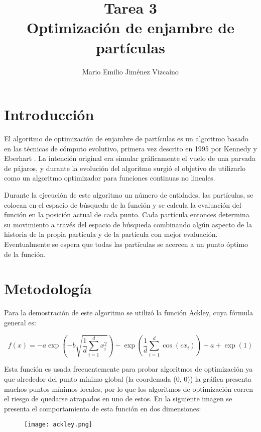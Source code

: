 \documentclass[sigconf,authorversion,nonacm]{acmart}
\begin{document}
\title{Tarea 3 \\ Optimización de enjambre de partículas}

\author{Mario Emilio Jiménez Vizcaíno}

\maketitle

\section{Introducción}
El algoritmo de optimización de enjambre de partículas es un algoritmo basado en las técnicas de cómputo evolutivo, primera vez descrito en 1995 por Kennedy y Eberhart \cite{kennedy1995particle}. La intención original era simular gráficamente el vuelo de una parvada de pájaros, y durante la evolución del algoritmo surgió el objetivo de utilizarlo como un algoritmo optimizador para funciones continuas no lineales.

Durante la ejecución de este algoritmo un número de entidades, las partículas, se colocan en el espacio de búsqueda de la función y se calcula la evaluación del función en la posición actual de cada punto. Cada partícula entonces determina su movimiento a través del espacio de búsqueda combinando algún aspecto de la historia de la propia partícula y de la partícula con mejor evaluación. Eventualmente se espera que todas las partículas se acercen a un punto óptimo de la función. \cite{poli2007particle}


\section{Metodología}
Para la demostración de este algoritmo se utilizó la función Ackley, cuya fórmula general es:

$$f(x) = -a \exp \left(-b \sqrt{\frac{1}{d} \sum_{i=1}^{d} x_i^2} \right) -\exp \left(\frac{1}{d} \sum_{i=1}^{d} \cos (c x_i) \right) + a + \exp (1)$$

Esta función es usada frecuentemente para probar algoritmos de optimización ya que alrededor del punto mínimo global (la coordenada (0, 0)) la gráfica presenta muchos puntos mínimos locales, por lo que los algoritmos de optimización corren el riesgo de quedarse atrapados en uno de estos. En la siguiente imagen se presenta el comportamiento de esta función en dos dimensiones:

\begin{figure}[H]
  \centering
  \texttt{[image: ackley.png]}
\end{figure}
\end{document}
